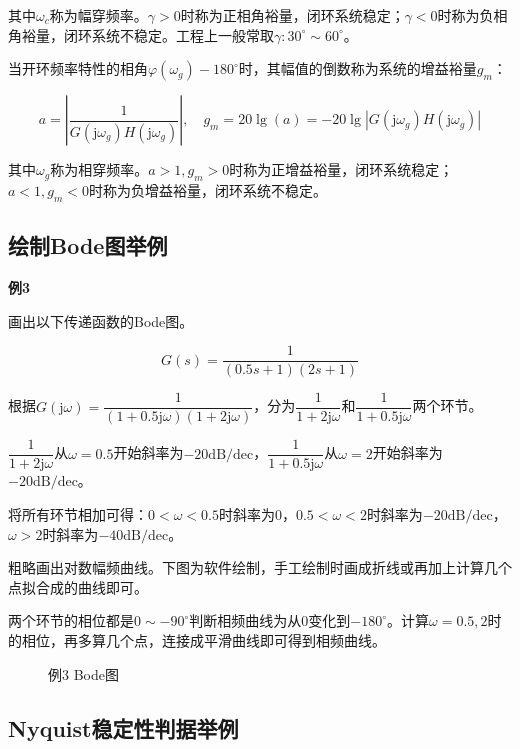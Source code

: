 \documentclass[cn, blue, normal, 12pt]{elegantnote}
\begin{document}
其中$\omega_c$称为幅穿频率。$\gamma>0$时称为正相角裕量，闭环系统稳定；$\gamma<0$时称为负相角裕量，闭环系统不稳定。工程上一般常取$\gamma:30^{\circ}\sim 60^{\circ}$。

当开环频率特性的相角$\varphi(\omega_g)-180^{\circ}$时，其幅值的倒数称为系统的增益裕量$g_m$：

\begin{equation}
    a=\left|\frac{1}{G(\mathrm{j}\omega_g)H(\mathrm{j}\omega_g)}\right|, \quad g_m=20\lg{(a)}=-20\lg{|G(\mathrm{j}\omega_g)H(\mathrm{j}\omega_g)|}
\end{equation}

其中$\omega_g$称为相穿频率。$a>1, g_m>0$时称为正增益裕量，闭环系统稳定；$a<1, g_m<0$时称为负增益裕量，闭环系统不稳定。

\subsection{绘制Bode图举例}

\textbf{例3}

画出以下传递函数的Bode图。

\begin{equation}
    G(s)=\frac{1}{(0.5s+1)(2s+1)}
\end{equation}

根据$G(\mathrm{j}\omega)=\dfrac{1}{(1+0.5\mathrm{j}\omega)(1+2\mathrm{j}\omega)}$，分为$\dfrac{1}{1+2\mathrm{j}\omega}$和$\dfrac{1}{1+0.5\mathrm{j}\omega}$两个环节。

$\dfrac{1}{1+2\mathrm{j}\omega}$从$\omega=0.5$开始斜率为$-20\mathrm{dB/dec}$，$\dfrac{1}{1+0.5\mathrm{j}\omega}$从$\omega=2$开始斜率为$-20\mathrm{dB/dec}$。

将所有环节相加可得：$0<\omega<0.5$时斜率为$0$，$0.5<\omega<2$时斜率为$-20\mathrm{dB/dec}$，$\omega>2$时斜率为$-40\mathrm{dB/dec}$。

粗略画出对数幅频曲线。下图为软件绘制，手工绘制时画成折线或再加上计算几个点拟合成的曲线即可。

两个环节的相位都是$0\sim -90^{\circ}$判断相频曲线为从0变化到$-180^{\circ}$。计算$\omega=0.5,2$时的相位，再多算几个点，连接成平滑曲线即可得到相频曲线。

\begin{figure}[htbp]
    \centering
    
    \caption{例3 Bode图}
\end{figure}

\subsection{Nyquist稳定性判据举例}
\end{document}

